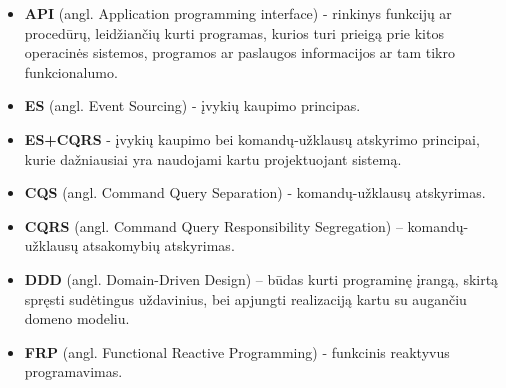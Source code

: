 \begin{itemize}

  \item \textbf{API} (angl. Application programming interface) - rinkinys funkcijų ar procedūrų, leidžiančių kurti programas, kurios turi prieigą prie kitos operacinės sistemos, programos ar paslaugos informacijos ar tam tikro funkcionalumo.

  \item \textbf{ES} (angl. Event Sourcing) - įvykių kaupimo principas.

  \item \textbf{ES+CQRS} - įvykių kaupimo bei komandų-užklausų atskyrimo principai, kurie dažniausiai yra naudojami kartu projektuojant sistemą.

  \item \textbf{CQS} (angl. Command Query Separation) - komandų-užklausų atskyrimas.

  \item \textbf{CQRS} (angl. Command Query Responsibility Segregation) – komandų-užklausų atsakomybių atskyrimas.

  \item \textbf{DDD} (angl. Domain-Driven Design) – būdas kurti programinę įrangą, skirtą spręsti sudėtingus uždavinius, bei apjungti realizaciją kartu su augančiu domeno modeliu.

  \item \textbf{FRP} (angl. Functional Reactive Programming) - funkcinis reaktyvus programavimas.

\end{itemize}

